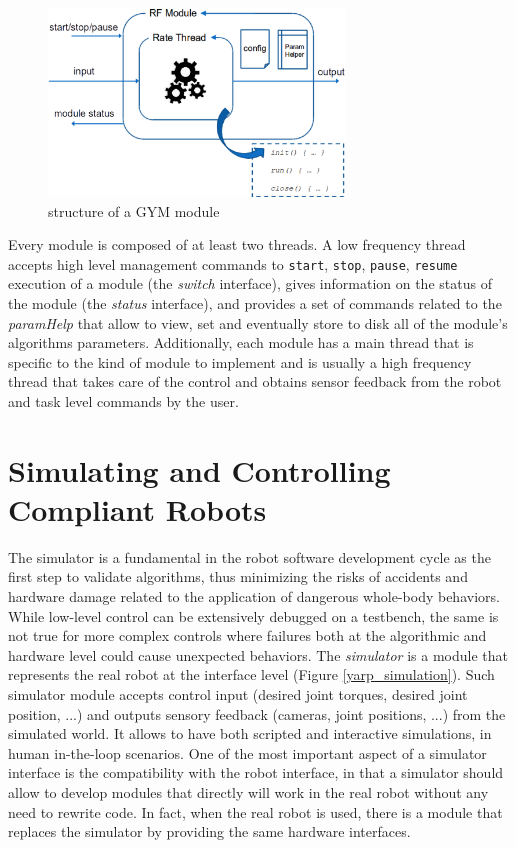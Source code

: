 \begin{figure}[!ht]
\centering
\includegraphics[width=0.7\textwidth]{images/GYM}
\caption{structure of a GYM module}
\label{gym}
\end{figure}

Every module is composed of at least two threads.
A low frequency thread accepts high level management commands to \texttt{start}, \texttt{stop}, \texttt{pause}, \texttt{resume} execution of a module (the \emph{switch} interface), gives information on the status of the module (the \emph{status} interface), and provides a set of commands related to the \emph{paramHelp} that allow to view, set and eventually store to disk all of the module's algorithms parameters. 
Additionally, each module has a main thread that is specific to the kind of module to implement and is usually a high frequency thread that takes care of the control and obtains sensor feedback from the robot and task level commands by the user.

\section{Simulating and Controlling Compliant Robots}
The simulator is a fundamental in the robot software development cycle as the first step to validate algorithms, thus minimizing the risks of accidents and hardware damage related to the application of dangerous whole-body behaviors. While low-level control can be extensively debugged on a testbench, the same is not true for more complex controls where failures both at the algorithmic and hardware level could cause unexpected behaviors.
The \emph{simulator} is a module that represents the real robot at the interface level (Figure \ref{yarp_simulation}). Such simulator module accepts control input (desired joint torques, desired joint position, ...) and outputs sensory feedback (cameras, joint positions, ...) from the simulated world. It allows to have both scripted and interactive simulations, in human in-the-loop scenarios. One of the most important aspect of a simulator interface is the compatibility with the robot interface, in that a simulator should allow to develop modules that directly will work in the real robot without any need to rewrite code. In fact, when the real robot is used, there is a module that replaces the simulator by providing the same hardware interfaces.

